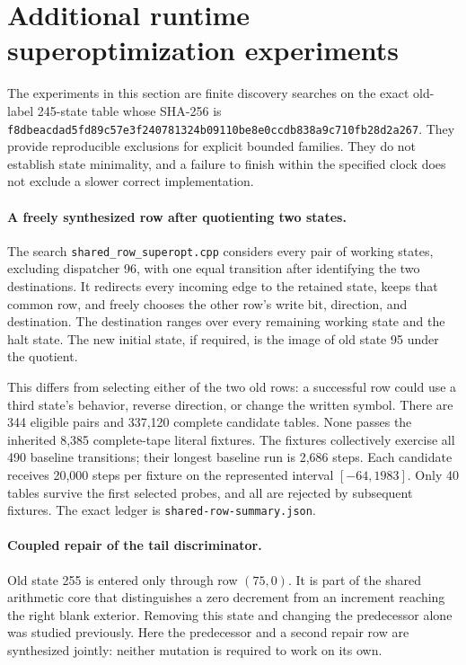 \section{Additional runtime superoptimization experiments}
\label{sec:runtime-superoptimization}

The experiments in this section are finite discovery searches on the exact
old-label 245-state table whose SHA-256 is
\texttt{f8dbeacdad5fd89c57e3f240781324b09110be8e0ccdb838a9c710fb28d2a267}.
They provide reproducible exclusions for explicit bounded families. They do
not establish state minimality, and a failure to finish within the specified
clock does not exclude a slower correct implementation.

\paragraph{A freely synthesized row after quotienting two states.}
The search \texttt{shared\_row\_superopt.cpp} considers every pair of working
states, excluding dispatcher 96, with one equal transition after identifying
the two destinations. It redirects every incoming edge to the retained state,
keeps that common row, and freely chooses the other row's write bit, direction,
and destination. The destination ranges over every remaining working state
and the halt state. The new initial state, if required, is the image of old
state 95 under the quotient.

This differs from selecting either of the two old rows: a successful row
could use a third state's behavior, reverse direction, or change the written
symbol. There are 344 eligible pairs and 337,120 complete candidate tables.
None passes the inherited 8,385 complete-tape literal fixtures. The fixtures
collectively exercise all 490 baseline transitions; their longest baseline
run is 2,686 steps. Each candidate receives 20,000 steps per fixture on the
represented interval $[-64,1983]$. Only 40 tables survive the first selected
probes, and all are rejected by subsequent fixtures. The exact ledger is
\texttt{shared-row-summary.json}.

\paragraph{Coupled repair of the tail discriminator.}
Old state 255 is entered only through row $(75,0)$. It is part of the shared
arithmetic core that distinguishes a zero decrement from an increment reaching
the right blank exterior. Removing this state and changing the predecessor
alone was studied previously. Here the predecessor and a second repair row are
synthesized jointly: neither mutation is required to work on its own.

